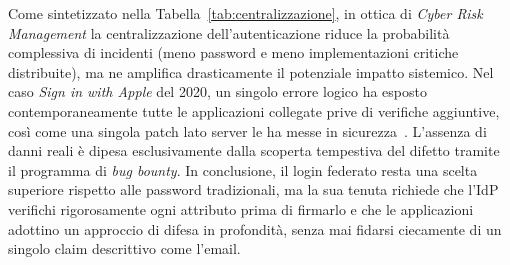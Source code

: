 Come sintetizzato nella Tabella~\ref{tab:centralizzazione}, in ottica di \emph{Cyber Risk Management} la centralizzazione dell'autenticazione riduce la probabilità complessiva di incidenti (meno password e meno implementazioni critiche distribuite), ma ne amplifica drasticamente il potenziale impatto sistemico. Nel caso \emph{Sign in with Apple} del 2020, un singolo errore logico ha esposto contemporaneamente tutte le applicazioni collegate prive di verifiche aggiuntive, così come una singola patch lato server le ha messe in sicurezza~\cite{jain-apple-2020,infoq2020}. L'assenza di danni reali è dipesa esclusivamente dalla scoperta tempestiva del difetto tramite il programma di \emph{bug bounty}. In conclusione, il login federato resta una scelta superiore rispetto alle password tradizionali, ma la sua tenuta richiede che l'IdP verifichi rigorosamente ogni attributo prima di firmarlo e che le applicazioni adottino un approccio di difesa in profondità, senza mai fidarsi ciecamente di un singolo claim descrittivo come l'email.
